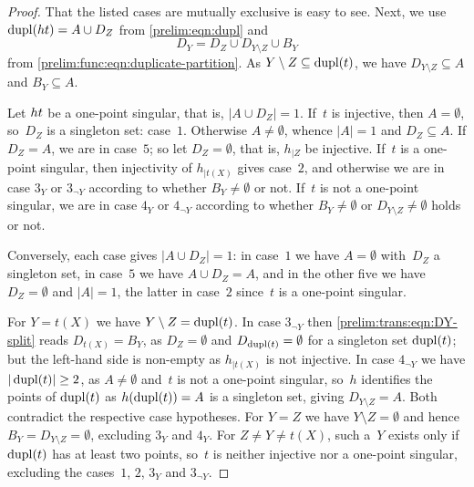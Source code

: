 \begin{proof}
	That the listed cases are mutually exclusive is easy to see. Next, 
	we use $\dupl{\concat{t}{h}} = A \cup D_Z$ from \cref{prelim:eqn:dupl} and
	\begin{equation} \label{prelim:trans:eqn:DY-split}
		D_Y = D_Z \cup D_{Y \setminus Z} \cup B_Y
	\end{equation}
	from \cref{prelim:func:eqn:duplicate-partition}. As
	$Y \setminus Z \subseteq \dupl{t}$, we have $D_{Y \setminus Z} \subseteq A$
	and $B_Y \subseteq A$.
	
	Let $\concat{t}{h}$ be a one-point singular, that is, $|A \cup D_Z| = 1$.
	If~$t$ is injective, then $A = \emptyset$, so~$D_Z$ is a singleton set:
	case~$1$.
	Otherwise $A \ne \emptyset$, whence $|A| = 1$ and $D_Z \subseteq A$. If
	$D_Z = A$, we are in case~$5$; so let $D_Z = \emptyset$, that is, $h_{|Z}$ be
	injective. If~$t$ is a one-point singular, then injectivity of $h_{|t(X)}$
	gives case~$2$, and otherwise we are in case $3_Y$ or $3_{\lnot Y}$ according
	to whether $B_Y \ne \emptyset$ or not. If~$t$ is not a one-point singular, we
	are in case $4_Y$ or $4_{\lnot Y}$ according to whether $B_Y \ne \emptyset$ or
	$D_{Y \setminus Z} \ne \emptyset$ holds or not.
	
	Conversely, each case gives $|A \cup D_Z| = 1$: in case~$1$ we have
	$A = \emptyset$ with~$D_Z$ a singleton set, in case~$5$ we have
	$A \cup D_Z = A$, and in the other five we have $D_Z = \emptyset$ and
	$|A| = 1$, the latter in case~$2$ since~$t$ is a one-point singular.
		
	For $Y = t(X)$ we have $Y \setminus Z = \dupl{t}$. In case $3_{\lnot Y}$ then
	\cref{prelim:trans:eqn:DY-split} reads $D_{t(X)} = B_Y$, as $D_Z = \emptyset$
	and $D_{\dupl{t}} = \emptyset$ for a singleton set $\dupl{t}$; but the
	left-hand side is non-empty as $h_{|t(X)}$ is not injective. In case
	$4_{\lnot Y}$ we have $|\dupl{t}| \ge 2$, as $A \ne \emptyset$ and~$t$ is not
	a one-point singular, so~$h$ identifies the points of $\dupl{t}$ as
	$h(\dupl{t}) = A$ is a singleton set, giving $D_{Y \setminus Z} = A$. Both
	contradict the respective case hypotheses.
	For $Y = Z$ we have $Y \setminus Z = \emptyset$ and hence
	$B_Y = D_{Y \setminus Z} = \emptyset$, excluding $3_Y$ and $4_Y$.
	For $Z \ne Y \ne t(X)$, such a~$Y$ exists only if $\dupl{t}$ has at least two
	points, so~$t$ is neither injective nor a one-point singular, excluding the
	cases~$1$, $2$, $3_Y$ and $3_{\lnot Y}$.
\end{proof}

